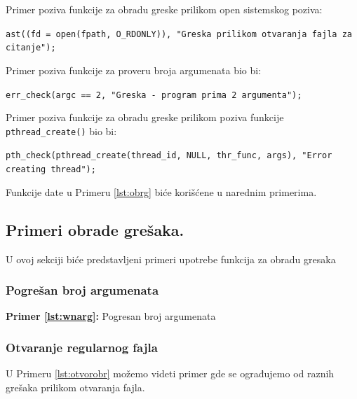\documentclass[a4paper, 11pt, twoside]{article}
\newcommand{\scode}[3] {
	\hspace{.06\textwidth} 
	\begin{minipage}[t]{.88\textwidth} %
		\begin{mdframed}[topline=true,bottomline=true,leftline=true,rightline=true,backgroundcolor=gray!22, linecolor=gray!60!black,roundcorner=1mm]
			 

	\begin{center}
		\caption{\textbf{Primer \ref{lst:#3}:} #2}
	\end{center}
	\end{mdframed}
	\end{minipage}

}
\begin{document}
\vspace{2mm} 
Primer poziva funkcije za obradu greske prilikom open sistemskog poziva: \\

\begin{center}
\vspace{-5mm} 
	\texttt{ast((fd = open(fpath, O\_RDONLY)), "Greska prilikom otvaranja fajla za citanje");} 
\end{center}
Primer poziva funkcije za proveru broja argumenata bio bi: \\

\begin{center}
\vspace{-5mm} 
\texttt{err\_check(argc == 2, "Greska - program prima 2 argumenta");} 
\end{center}
Primer poziva funkcije za obradu greske prilikom poziva funkcije \texttt{pthread\_create()} bio bi: \\

	\begin{center}
		\vspace{-5mm} 
		\texttt{pth\_check(pthread\_create(thread\_id, NULL, thr\_func, args), "Error creating thread");}
	\end{center}

	\vspace{1mm} 

Funkcije date u Primeru \ref{lst:obrg} biće korišćene u narednim primerima.

\newpage

\subsection{Primeri obrade grešaka.}

U ovoj sekciji biće predstavljeni primeri upotrebe funkcija za obradu gresaka

\subsubsection{Pogrešan broj argumenata}

\scode{wnarg.c}{Pogresan broj argumenata}{wnarg}

\subsubsection{Otvaranje regularnog fajla}

U Primeru \ref{lst:otvorobr} možemo videti primer gde se ograđujemo od raznih grešaka prilikom otvaranja fajla.
\end{document}
